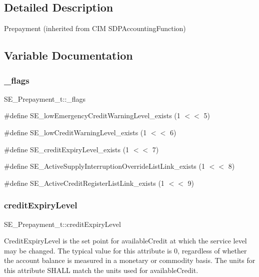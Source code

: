 \subsection{Detailed Description}
Prepayment (inherited from C\+IM S\+D\+P\+Accounting\+Function) 

\subsection{Variable Documentation}
\mbox{\label{group__Prepayment_gaabf22751d856f247a3f417b5ee94af95}} 
\subsubsection{\texorpdfstring{\+\_\+flags}{\_flags}}
{\footnotesize\ttfamily S\+E\+\_\+\+Prepayment\+\_\+t\+::\+\_\+flags}

\#define S\+E\+\_\+low\+Emergency\+Credit\+Warning\+Level\+\_\+exists (1 $<$$<$ 5)

\#define S\+E\+\_\+low\+Credit\+Warning\+Level\+\_\+exists (1 $<$$<$ 6)

\#define S\+E\+\_\+credit\+Expiry\+Level\+\_\+exists (1 $<$$<$ 7)

\#define S\+E\+\_\+\+Active\+Supply\+Interruption\+Override\+List\+Link\+\_\+exists (1 $<$$<$ 8)

\#define S\+E\+\_\+\+Active\+Credit\+Register\+List\+Link\+\_\+exists (1 $<$$<$ 9) \mbox{\label{group__Prepayment_ga8d49cc2f07392b397d2141d692eac22c}} 
\subsubsection{\texorpdfstring{credit\+Expiry\+Level}{creditExpiryLevel}}
{\footnotesize\ttfamily S\+E\+\_\+\+Prepayment\+\_\+t\+::credit\+Expiry\+Level}

Credit\+Expiry\+Level is the set point for available\+Credit at which the service level may be changed. The typical value for this attribute is 0, regardless of whether the account balance is measured in a monetary or commodity basis. The units for this attribute S\+H\+A\+LL match the units used for available\+Credit. \mbox{\label{group__Prepayment_ga875dbbfc5990ea5605a6b10150c00653}} 
